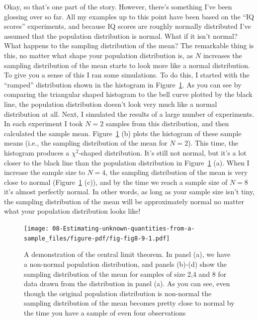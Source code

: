 \documentclass[
  a4paper,
]{book}
\begin{document}
Okay, so that's one part of the story. However, there's something I've
been glossing over so far. All my examples up to this point have been
based on the ``IQ scores'' experiments, and because IQ scores are
roughly normally distributed I've assumed that the population
distribution is normal. What if it isn't normal? What happens to the
sampling distribution of the mean? The remarkable thing is this, no
matter what shape your population distribution is, as \(N\) increases
the sampling distribution of the mean starts to look more like a normal
distribution. To give you a sense of this I ran some simulations. To do
this, I started with the ``ramped'' distribution shown in the histogram
in Figure~\ref{fig-fig8-9}. As you can see by comparing the triangular
shaped histogram to the bell curve plotted by the black line, the
population distribution doesn't look very much like a normal
distribution at all. Next, I simulated the results of a large number of
experiments. In each experiment I took \(N = 2\) samples from this
distribution, and then calculated the sample mean.
Figure~\ref{fig-fig8-9} (b) plots the histogram of these sample means
(i.e., the sampling distribution of the mean for \(N = 2\)). This time,
the histogram produces a \(\chi^2\)-shaped distribution. It's still not
normal, but it's a lot closer to the black line than the population
distribution in Figure~\ref{fig-fig8-9} (a). When I increase the sample
size to \(N = 4\), the sampling distribution of the mean is very close
to normal (Figure~\ref{fig-fig8-9} (c)), and by the time we reach a
sample size of \(N = 8\) it's almost perfectly normal. In other words,
as long as your sample size isn't tiny, the sampling distribution of the
mean will be approximately normal no matter what your population
distribution looks like!

\begin{figure}

\texttt{[image: 08-Estimating-unknown-quantities-from-a-sample\_files/figure-pdf/fig-fig8-9-1.pdf]} \hfill{}

\caption{\label{fig-fig8-9}A demonstration of the central limit theorem.
In panel (a), we have a non-normal population distribution, and panels
(b)-(d) show the sampling distribution of the mean for samples of size
2,4 and 8 for data drawn from the distribution in panel (a). As you can
see, even though the original population distribution is non-normal the
sampling distribution of the mean becomes pretty close to normal by the
time you have a sample of even four observations}

\end{figure}
\end{document}
